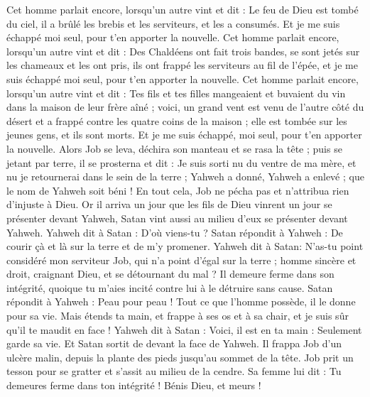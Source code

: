 \begin{multicols}{2}
Cet homme parlait encore, lorsqu'un autre vint et dit : Le feu de Dieu est tombé du ciel, il a brûlé les brebis et les serviteurs, et les a consumés. Et je me suis échappé moi seul, pour t'en apporter la nouvelle.
Cet homme parlait encore, lorsqu'un autre vint et dit : Des Chaldéens ont fait trois bandes, se sont jetés sur les chameaux et les ont pris, ils ont frappé les serviteurs au fil de l'épée, et je me suis échappé moi seul, pour t'en apporter la nouvelle.
Cet homme parlait encore, lorsqu'un autre vint et dit : Tes fils et tes filles mangeaient et buvaient du vin dans la maison de leur frère aîné ;
voici, un grand vent est venu de l'autre côté du désert et a frappé contre les quatre coins de la maison ; elle est tombée sur les jeunes gens, et ils sont morts. Et je me suis échappé, moi seul, pour t'en apporter la nouvelle.
Alors Job se leva, déchira son manteau et se rasa la tête ; puis se jetant par terre, il se prosterna
et dit : Je suis sorti nu du ventre de ma mère, et nu je retournerai dans le sein de la terre ; Yahweh a donné, Yahweh a enlevé ; que le nom de Yahweh soit béni !
En tout cela, Job ne pécha pas et n'attribua rien d'injuste à Dieu.
\VerseOne{}Or il arriva un jour que les fils de Dieu vinrent un jour se présenter devant Yahweh, Satan vint aussi au milieu d'eux se présenter devant Yahweh.
Yahweh dit à Satan : D'où viens-tu ? Satan répondit à Yahweh : De courir çà et là sur la terre et de m'y promener.
Yahweh dit à Satan: N'as-tu point considéré mon serviteur Job, qui n'a point d'égal sur la terre ; homme sincère et droit, craignant Dieu, et se détournant du mal ? Il demeure ferme dans son intégrité, quoique tu m'aies incité contre lui à le détruire sans cause.
Satan répondit à Yahweh : Peau pour peau ! Tout ce que l'homme possède, il le donne pour sa vie.
Mais étends ta main, et frappe à ses os et à sa chair, et je suis sûr qu'il te maudit en face !
Yahweh dit à Satan : Voici, il est en ta main : Seulement garde sa vie.
Et Satan sortit de devant la face de Yahweh. Il frappa Job d'un ulcère malin, depuis la plante des pieds jusqu'au sommet de la tête.
Job prit un tesson pour se gratter et s'assit au milieu de la cendre.
Sa femme lui dit : Tu demeures ferme dans ton intégrité ! Bénis Dieu, et meurs !

\end{multicols}
